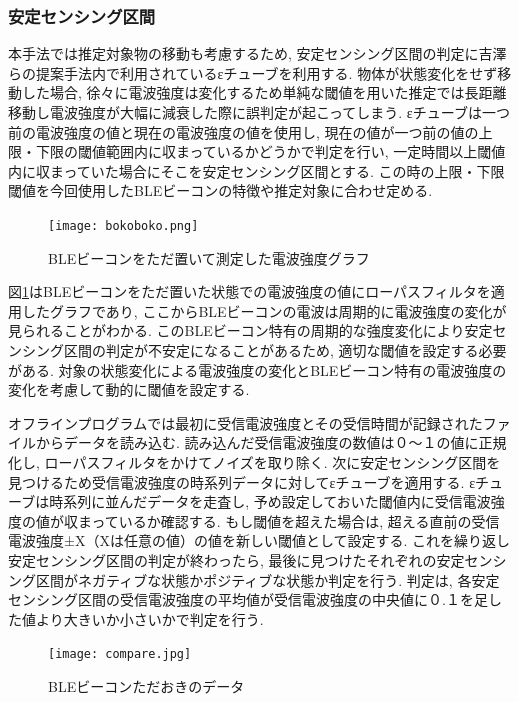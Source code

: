\documentclass[Japanese]{dicomopapers}
\begin{document}
\subsubsection{安定センシング区間}
本手法では推定対象物の移動も考慮するため, 安定センシング区間の判定に吉澤らの提案手法\cite{ips-chube}内で利用されているεチューブを利用する.
物体が状態変化をせず移動した場合, 徐々に電波強度は変化するため単純な閾値を用いた推定では長距離移動し電波強度が大幅に減衰した際に誤判定が起こってしまう.
εチューブは一つ前の電波強度の値と現在の電波強度の値を使用し, 現在の値が一つ前の値の上限・下限の閾値範囲内に収まっているかどうかで判定を行い, 一定時間以上閾値内に収まっていた場合にそこを安定センシング区間とする.
この時の上限・下限閾値を今回使用したBLEビーコンの特徴や推定対象に合わせ定める.
\begin{figure}[ht]
    \centering
    \texttt{[image: bokoboko.png]}
    \caption{BLEビーコンをただ置いて測定した電波強度グラフ}
    \label{nomal-data}
\end{figure}

図\ref{nomal-data}はBLEビーコンをただ置いた状態での電波強度の値にローパスフィルタを適用したグラフであり, ここからBLEビーコンの電波は周期的に電波強度の変化が見られることがわかる.
このBLEビーコン特有の周期的な強度変化により安定センシング区間の判定が不安定になることがあるため, 適切な閾値を設定する必要がある.
対象の状態変化による電波強度の変化とBLEビーコン特有の電波強度の変化を考慮して動的に閾値を設定する.

オフラインプログラムでは最初に受信電波強度とその受信時間が記録されたファイルからデータを読み込む.
読み込んだ受信電波強度の数値は０〜１の値に正規化し, ローパスフィルタをかけてノイズを取り除く.
次に安定センシング区間を見つけるため受信電波強度の時系列データに対してεチューブを適用する.
εチューブは時系列に並んだデータを走査し, 予め設定しておいた閾値内に受信電波強度の値が収まっているか確認する.
もし閾値を超えた場合は, 超える直前の受信電波強度±X（Xは任意の値）の値を新しい閾値として設定する.
これを繰り返し安定センシング区間の判定が終わったら, 最後に見つけたそれぞれの安定センシング区間がネガティブな状態かポジティブな状態か判定を行う.
判定は, 各安定センシング区間の受信電波強度の平均値が受信電波強度の中央値に０.１を足した値より大きいか小さいかで判定を行う.


\begin{figure}[ht]
 \centering
 \texttt{[image: compare.jpg]}
 \caption{BLEビーコンただおきのデータ}
 \label{compare}
\end{figure}
\end{document}
